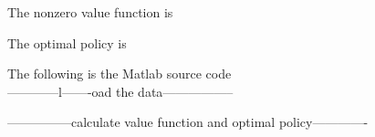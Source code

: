 \documentclass[18pt]{article} %
\title{\textbf{ \begin{LARGE}CSE150:Introduction to Artificial Intelligence\end{LARGE}}\\ [0ex]\begin{Large} Homework 4 \end{Large} }
\author{Ning Ma}
\date{} %
\theoremstyle{definition}\newtheorem{law}{Law}
\theoremstyle{plain}\newtheorem{jury}[law]{Jury}
\theoremstyle{remark}\newtheorem{juu}{Juu}
\theoremstyle{definition}\newtheorem{kuu}[law]{Kuu}
\theoremstyle{definition}\newtheorem{muu}{Muu}[section]
\theoremstyle{definition}\newtheorem{honoluu}{Honoluu}[section]
\theoremstyle{definition}\newtheorem{konoluu}[muu]{Konoluu}
\begin{document}
The nonzero value function is 


The optimal policy is 


The following is the Matlab source code\\
------------l-------oad the data-----------------


---------------calculate value function and optimal policy-------------

\end{document}
